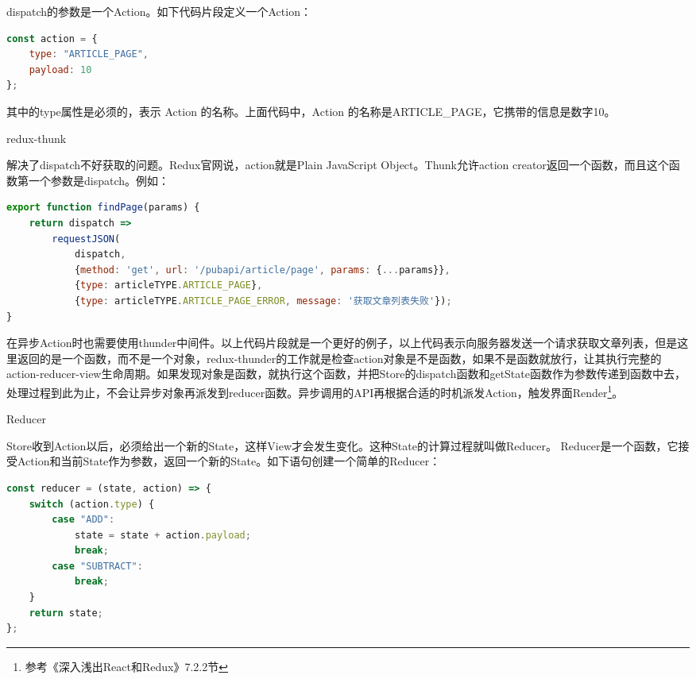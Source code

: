 \documentclass[12pt]{book}
\makeatletter
\numberwithin{dummy}{section}
\theoremstyle{ocrenumbox}
\theoremstyle{blacknumex}
\theoremstyle{blacknumbox}
\theoremstyle{ocrenum}
\renewcommand{\subsection}{\@startsection {subsection}{2}{\z@}
	{-3ex \@plus -0.1ex \@minus -.4ex}
	{0.5ex \@plus.2ex }
	{\normalfont\sffamily\bfseries}}
\renewcommand\paragraph{\@startsection{paragraph}{4}{\z@}
	{-2ex \@plus-.2ex \@minus .2ex}
	{.1ex}
	{\normalfont\small\sffamily\bfseries}}
\makeatother
\begin{document}
dispatch的参数是一个Action。如下代码片段定义一个Action：

\begin{lstlisting}[language=Javascript]
const action = {
	type: "ARTICLE_PAGE",
	payload: 10
};
\end{lstlisting}

其中的type属性是必须的，表示 Action 的名称。上面代码中，Action 的名称是ARTICLE\_PAGE，它携带的信息是数字10。

\paragraph{redux-thunk}

解决了dispatch不好获取的问题。Redux官网说，action就是Plain JavaScript Object。Thunk允许action creator返回一个函数，而且这个函数第一个参数是dispatch。例如：

\begin{lstlisting}[language=Javascript]
export function findPage(params) {
	return dispatch =>
		requestJSON(
			dispatch,
			{method: 'get', url: '/pubapi/article/page', params: {...params}},
			{type: articleTYPE.ARTICLE_PAGE},
			{type: articleTYPE.ARTICLE_PAGE_ERROR, message: '获取文章列表失败'});
}
\end{lstlisting}

在异步Action时也需要使用thunder中间件。以上代码片段就是一个更好的例子，以上代码表示向服务器发送一个请求获取文章列表，但是这里返回的是一个函数，而不是一个对象，redux-thunder的工作就是检查action对象是不是函数，如果不是函数就放行，让其执行完整的action-reducer-view生命周期。如果发现对象是函数，就执行这个函数，并把Store的dispatch函数和getState函数作为参数传递到函数中去，处理过程到此为止，不会让异步对象再派发到reducer函数。异步调用的API再根据合适的时机派发Action，触发界面Render\footnote{参考《深入浅出React和Redux》7.2.2节}。

\subsection{Reducer}

Store收到Action以后，必须给出一个新的State，这样View才会发生变化。这种State的计算过程就叫做Reducer。
Reducer是一个函数，它接受Action和当前State作为参数，返回一个新的State。如下语句创建一个简单的Reducer：

\begin{lstlisting}[language=Javascript]
const reducer = (state, action) => {
	switch (action.type) {
		case "ADD":
			state = state + action.payload;
			break;
		case "SUBTRACT":
			break;
	}
	return state;
};
\end{lstlisting}
\end{document}

